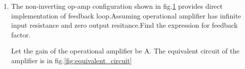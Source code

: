 \begin{enumerate}[label=\thesubsection.\arabic*.,ref=\thesubsection.\theenumi]

\item
The non-inverting op-amp configuration shown in fig.\ref{fig:original_circuit} provides direct implementation of feedback loop.Assuming operational amplifier has infinite input resistance and zero output resitance.Find the expression for feedback factor.
\begin{figure}[!ht]
	\begin{center}
		
		\resizebox{\columnwidth}{!}{}
	\end{center}
\caption{}
\label{fig:original_circuit}
\end{figure}
\solution Let the gain of the operational amplifier be A.
The equivalent circuit of the amplifier is in fig.\ref{fig:equivalent_circuit}
\begin{figure}[!ht]
	\begin{center}
		

\end{center}
\end{figure}
\end{enumerate}

